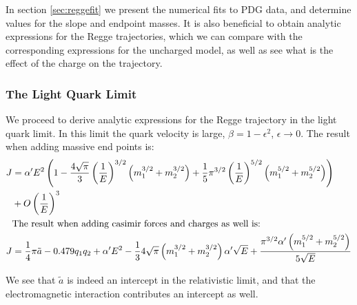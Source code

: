 \documentclass[11pt,a4paper]{article}
\begin{document}
In section \ref{sec:reggefit} we present the numerical fits to PDG data, and determine values for the slope and endpoint masses.  It is also beneficial to obtain analytic expressions for the Regge trajectories, which we can compare with the corresponding expressions for the uncharged model, as well as see what is the effect of the charge on the trajectory.
\FloatBarrier 
\subsubsection{The Light Quark Limit}
We proceed to derive analytic expressions for the Regge trajectory in the light quark limit.
In this limit the quark velocity is large, $\beta=1-\epsilon^{2}$, $\epsilon\rightarrow0$.
The result when adding massive end points is:
\begin{subequations}
\label{eq:reggeAnalyticLight}
\begin{align}
J&=\alpha' E^2\left(1-\frac{4\sqrt{\pi}}{3}\left(\frac{1}{E}\right)^{3/2}\left(m_{1}^{3/2}+m_{2}^{3/2}\right)+\frac{1}{5}\pi^{3/2}\left(\frac{1}{E}\right)^{5/2}\left(m_{1}^{5/2}+m_{2}^{5/2}\right)\right)\notag\\
&+O\left(\frac{1}{E}\right)^{3}\\
&\text{The result when adding casimir forces and charges as well is:}\notag\\
J&=\frac{1}{4}\pi\tilde{a}-0.479 q_1q_2+\alpha' E^2-\frac{1}{3}4 \sqrt{\pi }  \left(m_1^{3/2}+m_2^{3/2}\right)\alpha'\sqrt{E}+\frac{\pi^{3/2}\alpha' \left(m_1^{5/2}+m_2^{5/2}\right)}{5 \sqrt{E}}
\end{align}
\end{subequations}

We see that $\tilde{a}$ is indeed an intercept in the relativistic limit, and that the electromagnetic interaction contributes an intercept as well.

\FloatBarrier 
\end{document}
